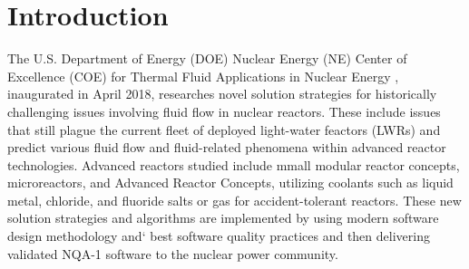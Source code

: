 \section{Introduction}
\label{s:intro}

The U.S. Department of Energy (DOE) Nuclear Energy (NE) Center of Excellence (COE) for Thermal Fluid Applications in Nuclear Energy \cite{shaver2019initial}, inaugurated in April 2018, researches novel solution strategies for historically challenging issues involving fluid flow in nuclear reactors. These include issues that still plague the current fleet of deployed light-water feactors (LWRs) and predict various fluid flow and fluid-related phenomena within advanced reactor technologies. Advanced reactors studied include mmall modular reactor concepts, microreactors, and Advanced Reactor Concepts, utilizing coolants such as liquid metal, chloride, and fluoride salts or gas for accident-tolerant reactors. These new solution strategies and algorithms are implemented by using modern software design methodology and` best software quality practices and then delivering validated NQA-1 software to the nuclear power community.

